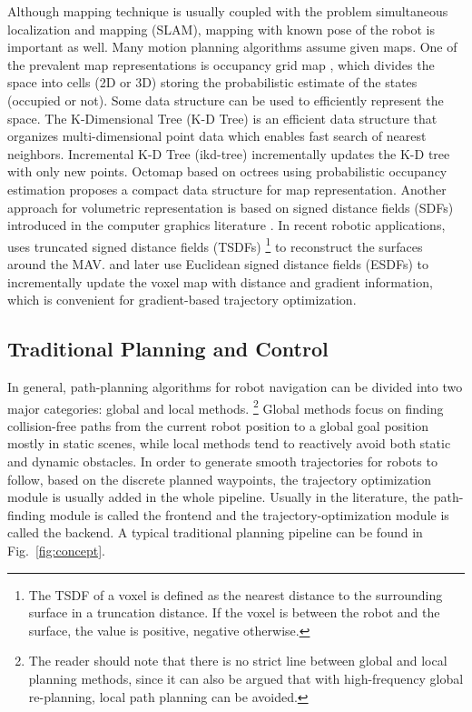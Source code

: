 \documentclass[letterpaper,journal,twoside]{IEEEtran}
\begin{document}
Although mapping technique is usually coupled with the problem 
simultaneous localization and mapping (SLAM), mapping with
known pose of the robot is important as well. 
Many motion planning algorithms assume given maps. 
One of the prevalent map representations is occupancy 
grid map \cite{elfes2013occupancy}, which divides the space
into cells (2D or 3D) storing the probabilistic estimate of the 
states (occupied or not).
Some data structure can be used to efficiently 
represent the space. 
The K-Dimensional Tree (K-D Tree) is an efficient data
structure that organizes multi-dimensional point data 
\cite{bentley1975multidimensional}
which enables fast search of nearest neighbors.
Incremental K-D Tree (ikd-tree) \cite{cai2021ikd} 
incrementally updates the K-D tree with only new points.
Octomap \cite{wurm2010octomap} based on octrees using 
probabilistic occupancy estimation proposes a compact 
data structure for map representation.
Another approach for volumetric representation is based on 
signed distance fields (SDFs) introduced in the computer
graphics literature \cite{curless1996volumetric}.
In recent robotic applications, \cite{lin2018autonomous} uses
truncated signed distance fields (TSDFs)
\footnote{The TSDF of a voxel is defined as the nearest 
distance to the surrounding surface in a truncation distance. 
If the voxel is between the robot and the surface, 
the value is positive, negative otherwise. }
to reconstruct the surfaces around the MAV. 
\cite{oleynikova2017voxblox} and later \cite{han2019fiesta}
use Euclidean signed distance fields (ESDFs) to incrementally
update the voxel map with distance and gradient information, 
which is convenient for gradient-based trajectory optimization.

\subsection{Traditional Planning and Control}



In general, path-planning algorithms for robot navigation 
can be divided into two major categories: 
global and local methods.
\footnote{The reader should note that there is no strict 
line between global and local planning methods, since
it can also be argued that with high-frequency global
re-planning, local path planning can be avoided.}  
Global methods focus on finding collision-free paths from 
the current robot position to a global goal position mostly 
in static scenes, while local methods tend to reactively 
avoid both static and dynamic obstacles. 
In order to generate smooth trajectories for robots to 
follow, based on the discrete planned waypoints, the 
trajectory optimization module is usually added in the 
whole pipeline. 
Usually in the literature, the path-finding module 
is called the frontend and the 
trajectory-optimization module is called the backend. 
A typical traditional planning pipeline can be 
found in Fig.~\ref{fig:concept}.
\end{document}
